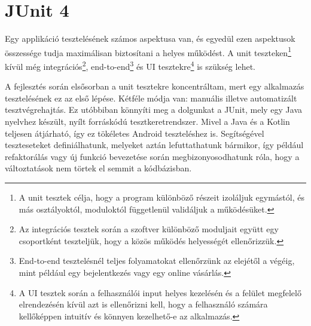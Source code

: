 \section{JUnit 4}

Egy applikáció tesztelésének számos aspektusa van, és egyedül ezen aspektusok összessége tudja maximálisan biztosítani a helyes működést. A unit teszteken\footnote{A unit tesztek célja, hogy a program különböző részeit izoláljuk egymástól, és más osztályoktól, moduloktól függetlenül validáljuk a működésüket.} kívül még integrációs\footnote{Az integrációs tesztek során a szoftver különböző moduljait együtt egy csoportként teszteljük, hogy a közös működés helyességét ellenőrizzük.\cite{IntegrationTest}}, end-to-end\footnote{End-to-end tesztelésnél teljes folyamatokat ellenőrzünk az elejétől a végéig, mint például egy bejelentkezés vagy egy online vásárlás.\cite{EndtoEndTest}} és UI tesztekre\footnote{A UI tesztek során a felhasználói input helyes kezelésén és a felület megfelelő elrendezésén kívül azt is ellenőrizni kell, hogy a felhasználó számára kellőképpen intuitív és könnyen kezelhető-e az alkalmazás.\cite{UITest}} is szükség lehet.


A fejlesztés során elsősorban a unit tesztekre koncentráltam, mert egy alkalmazás tesztelésének ez az első lépése. Kétféle módja van: manuális illetve automatizált tesztvégrehajtás. Ez utóbbiban könnyíti meg a dolgunkat a JUnit, mely egy Java nyelvhez készült, nyílt forráskódú tesztkeretrendszer. Mivel a Java és a Kotlin teljesen átjárható, így ez tökéletes Android teszteléshez is. Segítségével teszteseteket definiálhatunk, melyeket aztán lefuttathatunk bármikor, így például refaktorálás vagy új funkció bevezetése során megbizonyosodhatunk róla, hogy a változtatások nem törtek el semmit a kódbázisban.



